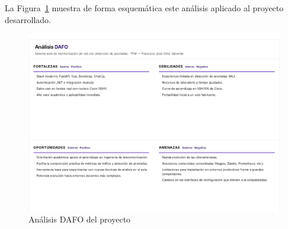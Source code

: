 La Figura~\ref{fig:dafo} muestra de forma esquemática este análisis aplicado
al proyecto desarrollado.

\begin{landscape}
\begin{figure}[H]
  \centering
  \includegraphics[height=\textwidth]{canva/DAFO.pdf}
  \caption{Análisis DAFO del proyecto}
  \label{fig:dafo}
\end{figure}
\end{landscape}